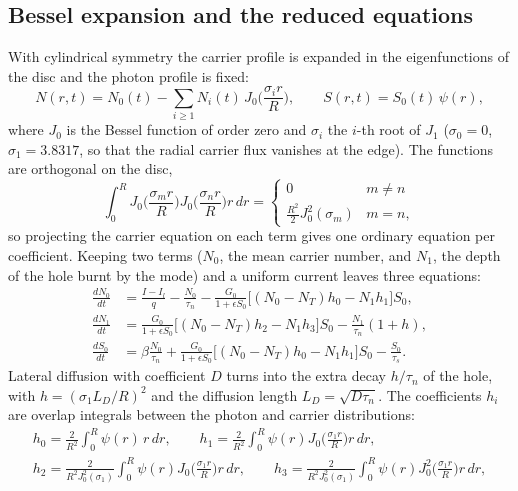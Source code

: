 \subsection{Bessel expansion and the reduced equations}
With cylindrical symmetry the carrier profile is expanded in the eigenfunctions of the disc and
the photon profile is fixed:
\begin{equation}
  N(r,t)=N_0(t)-\sum_{i\ge1}N_i(t)\,J_0\Big(\frac{\sigma_ir}{R}\Big),\qquad S(r,t)=S_0(t)\,\psi(r),
\end{equation}
where $J_0$ is the Bessel function of order zero and $\sigma_i$ the $i$-th root of $J_1$
($\sigma_0=0$, $\sigma_1=3.8317$, so that the radial carrier flux vanishes at the edge). The functions
are orthogonal on the disc,
\begin{equation}
  \int_0^RJ_0\Big(\frac{\sigma_mr}{R}\Big)J_0\Big(\frac{\sigma_nr}{R}\Big)r\,dr=
  \begin{cases}0 & m\ne n\\ \frac{R^2}{2}J_0^2(\sigma_m) & m=n,\end{cases}
\end{equation}
so projecting the carrier equation on each term gives one ordinary equation per coefficient.
Keeping two terms ($N_0$, the mean carrier number, and $N_1$, the depth of the hole burnt by the
mode) and a uniform current leaves three equations:
\begin{align}
  \frac{dN_0}{dt}&=\frac{I-I_l}{q}-\frac{N_0}{\tau_n}-\frac{G_0}{1+\epsilon S_0}\big[(N_0-N_T)h_0-N_1h_1\big]S_0,\\
  \frac{dN_1}{dt}&=\frac{G_0}{1+\epsilon S_0}\big[(N_0-N_T)h_2-N_1h_3\big]S_0-\frac{N_1}{\tau_n}(1+h),\\
  \frac{dS_0}{dt}&=\beta\frac{N_0}{\tau_n}+\frac{G_0}{1+\epsilon S_0}\big[(N_0-N_T)h_0-N_1h_1\big]S_0-\frac{S_0}{\tau_s}.
\end{align}
Lateral diffusion with coefficient $D$ turns into the extra decay $h/\tau_n$ of the hole, with
$h=(\sigma_1L_D/R)^2$ and the diffusion length $L_D=\sqrt{D\tau_n}$. The coefficients $h_i$ are overlap
integrals between the photon and carrier distributions:
\begin{gather}
  h_0=\frac{2}{R^2}\int_0^R\psi(r)\,r\,dr,\qquad
  h_1=\frac{2}{R^2}\int_0^R\psi(r)J_0\Big(\frac{\sigma_1r}{R}\Big)r\,dr,\\
  h_2=\frac{2}{R^2J_0^2(\sigma_1)}\int_0^R\psi(r)J_0\Big(\frac{\sigma_1r}{R}\Big)r\,dr,\qquad
  h_3=\frac{2}{R^2J_0^2(\sigma_1)}\int_0^R\psi(r)J_0^2\Big(\frac{\sigma_1r}{R}\Big)r\,dr,
\end{gather}

